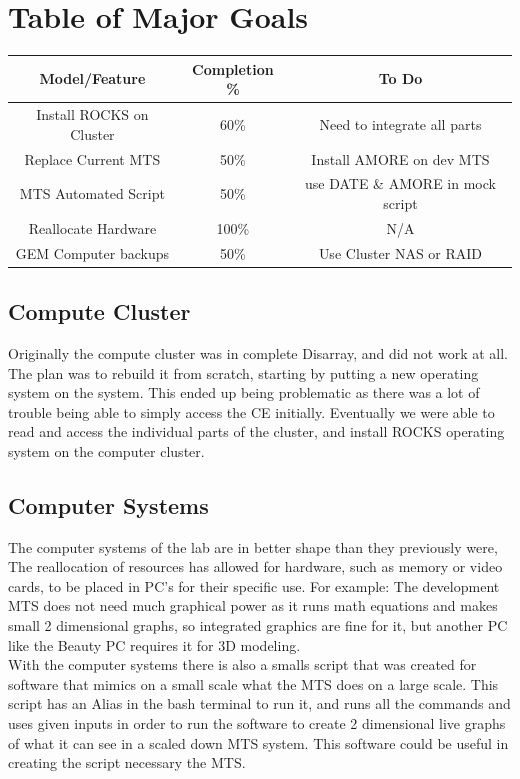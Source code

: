 \documentclass[12pt]{article}
\newcommand\tab[1][1cm]{\hspace*{#1}}
\begin{document}
\section{Table of Major Goals}
\begin{tabular}{|c|c|c|}
	\hline
	Model/Feature & Completion \% & To Do \\
	\hline
	Install ROCKS on Cluster & 60\% & Need to integrate all parts \\
	\hline
	Replace Current MTS & 50\% & Install AMORE on dev MTS \\
	\hline
	MTS Automated Script & 50\% & use DATE \& AMORE in mock script \\
	\hline
	Reallocate Hardware & 100\% & N/A \\
	\hline
	GEM Computer backups & 50\% & Use Cluster NAS or RAID \\
	\hline
	
\end{tabular}
\subsection{Compute Cluster}
\tab Originally the compute cluster was in complete Disarray, and did not work at all. The plan was to rebuild it from scratch, starting by putting a new operating system on the system. This ended up being problematic as there was a lot of trouble being able to simply access the CE initially. Eventually we were able to read and access the individual parts of the cluster, and install ROCKS operating system on the computer cluster. 
\subsection{Computer Systems}
\tab The computer systems of the lab are in better shape than they previously were, The reallocation of resources has allowed for hardware, such as memory or video cards, to be placed in PC's for their specific use. For example: The development MTS does not need much graphical power as it runs math equations and makes small 2 dimensional graphs, so integrated graphics are fine for it, but another PC like the Beauty PC requires it for 3D modeling. \\
\tab With the computer systems there is also a smalls script that was created for software that mimics on a small scale what the MTS does on a large scale. This script has an Alias in the bash terminal to run it, and runs all the commands and uses given inputs in order to run the software to create 2 dimensional live graphs of what it can see in a scaled down MTS system. This software could be useful in creating the script necessary the MTS.
\end{document}

